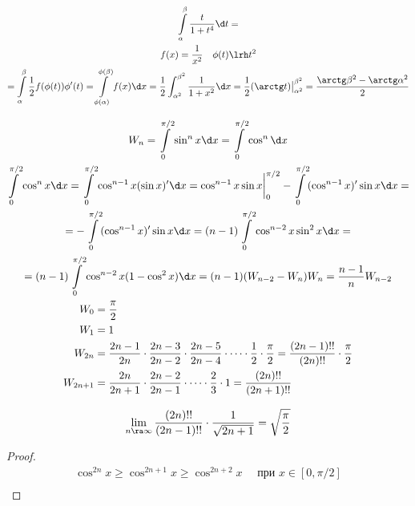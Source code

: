
\begin{exmp}
	\begin{gather*}
		\int\limits_\alpha^\beta \frac{t}{1+t^4} \d t = \\
		f(x) = \frac1{x^2} \quad \phi(t) \lrh t^2 \\
		= \int\limits_\alpha^\beta \frac12 f(\phi(t))\phi'(t) = \int\limits_{\phi(\alpha)}^{\phi(\beta)} f(x) \d x = \frac12 \int_{\alpha^2}^{\beta^2} \frac{1}{1+x^2} \d x = \frac12 (\arctg t)\bigr|_{\alpha^2}^{\beta^2} = \frac{\arctg \beta^2 - \arctg \alpha^2}2
	\end{gather*}
\end{exmp}

\begin{exmp}
	\begin{gather*}
		W_n = \int\limits_0^{\pi / 2} \sin^n x \d x = \int\limits_0^{\pi / 2} \cos^n \d x \\
		\int\limits^{\pi/2}_0 \cos^{n} x \d x = \int \limits_0^{\pi/2} \cos^{n - 1}x(\sin x)'\d x =
		\cos^{n - 1}x\sin x \biggr|_{0}^{\pi/2} - \int\limits_0^{\pi/2}(\cos^{n - 1}x)'\sin x \d x = \\
		= -\int\limits_0^{\pi/2}(\cos^{n - 1}x)'\sin x \d x = (n - 1)\int\limits_0^{\pi/2}\cos^{n - 2}x\sin^2x\d x = \\
		= (n - 1)\int\limits_0^{\pi/2}\cos^{n - 2}x(1 - \cos^2x)\d x = (n - 1)(W_{n - 2} - W_n)
		W_n = \frac{n - 1}{n}W_{n - 2} \\
		\begin{aligned}
			W_0 &= \frac\pi2 \\
			W_1 &= 1 \\
			W_{2n} &= \frac{2n - 1}{2n} \cdot \frac{2n - 3}{2n - 2} \cdot \frac{2n - 5}{2n - 4} \cdot \dots \cdot \frac{1}{2} \cdot \frac\pi2 = \frac{(2n - 1)!!}{(2n)!!} \cdot \frac\pi2 \\
			W_{2n + 1} &= \frac{2n}{2n + 1} \cdot \frac{2n - 2}{2n - 1} \cdot \dots \cdot \frac{2}{3} \cdot 1 = \frac{(2n)!!}{(2n + 1)!!}
		\end{aligned}
	\end{gather*}
	\begin{assertion}
		\[ \lim_{n \ra \infty} \frac{(2n)!!}{(2n - 1)!!}\cdot\frac{1}{\sqrt{2n + 1}} = \sqrt{\frac\pi2} \]
	\end{assertion}
	\begin{proof}
		\begin{gather*}
			\cos^{2n} x \ge \cos^{2n + 1}x \ge \cos^{2n + 2}x \quad\text{ при $x\in[0, \pi/2]$} \\

\end{gather*}
\end{proof}
\end{exmp}
